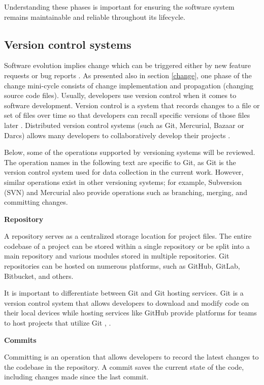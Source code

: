 Understanding these phases is important for ensuring the software system remains maintainable and reliable throughout its lifecycle.


\subsection{Version control systems}

\hspace{4em}Software evolution implies change which can be triggered either by new feature requests or bug reports \cite{articleEvolution}. As presented also in section \ref{change}, one phase of the change mini-cycle consists of change implementation and propagation (changing source code files). 
Usually, developers use version control when it comes to software development. Version control is a system that records changes to a file or set of files over time so that developers can recall specific versions of those files later \cite{svn}.
Distributed version control systems (such as Git, Mercurial, Bazaar or Darcs) allows many developers to collaboratively develop their projects \cite{7471284}.

Below, some of the operations supported by versioning systems will be reviewed. The operation names in the following text are specific to Git, as Git is the version control system used for data collection in the current work. However, similar operations exist in other versioning systems; for example, Subversion (SVN) and Mercurial also provide operations such as branching, merging, and committing changes.

\textbf{Repository}

A repository serves as a centralized storage location for project files. The entire codebase of a project can be stored within a single repository or be split into a main repository and various modules stored in multiple repositories. Git repositories can be hosted on numerous platforms, such as GitHub, GitLab, Bitbucket, and others.

It is important to differentiate between Git and Git hosting services. Git is a version control system that allows developers to download and modify code on their local devices while hosting services like GitHub provide platforms for teams to host projects that utilize Git \cite{git}, \cite{github}.

\textbf{Commits}

Committing is an operation that allows developers to record the latest changes to the codebase in the repository. A commit saves the current state of the code, including changes made since the last commit.

